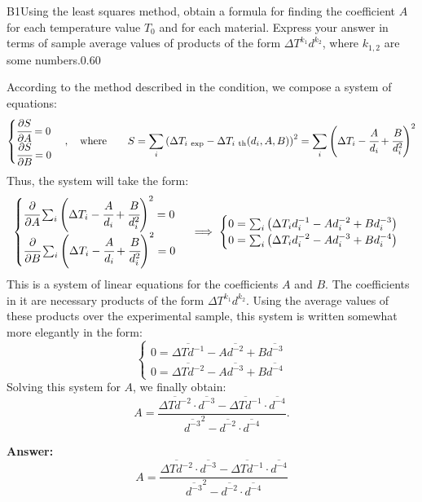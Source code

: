 \documentclass[11pt,a4paper]{article}
\begin{document}
\begin{solcard}{B1}{Using the least squares method, obtain a formula for finding the coefficient $A$ for each temperature value $T_0$ and for each material. Express your answer in terms of sample average values of products of the form $\Delta T^{k_1}d^{k_2}$, where $k_{1,2}$ are some numbers.}{0.60}

According to the method described in the condition, we compose a system of equations:\[\begin{cases} \cfrac{\partial S}{\partial A}=0\\ \cfrac{\partial S}{\partial B}=0\end{cases}, \quad  \text{where} \quad\quad S=\sum_i\left(\Delta T_{i\ \mathrm{exp}}-\Delta T_{i\ \mathrm{th}}(d_i, A, B)\right)^2=\sum_i\left(\Delta T_i-\cfrac A{d_i}+\cfrac B{d_i^2}\right)^2\]Thus, the system will take the form:\[\begin{cases} \cfrac\partial{\partial A}\sum_i\left(\Delta T_i-\cfrac A{d_i}+\cfrac B{d_i^2}\right)^2=0\\\cfrac\partial{\partial B}\sum_i\left(\Delta T_i-\cfrac A{d_i}+\cfrac B{d_i^2}\right)^2=0\end{cases}\implies\begin{cases}0=\sum_i\left(\Delta T_id_i^{-1}-Ad_i^{-2}+Bd_i^{-3}\right)\\0=\sum_i\left(\Delta T_id_i^{-2}-Ad_i^{-3}+Bd_i^{-4}\right)\end{cases}\]This is a system of linear equations for the coefficients $A$ and $B$. The coefficients in it are necessary products of the form $\Delta T^{k_1}d^{k_2}$. Using the average values of these products over the experimental sample, this system is written somewhat more elegantly in the form:\[\begin{cases}0=\overline{\Delta Td^{-1}}-A\overline{d^{-2}}+B\overline{d^{-3}}\\0=\overline{\Delta Td^{-2}}-A\overline{d^{-3}}+B\overline{d^{-4}}\end{cases}\]Solving this system for $A$, we finally obtain:\[A=\frac{\overline{\Delta Td^{-2}}\cdot\overline{d^{-3}}-\overline{\Delta Td^{-1}}\cdot\overline{d^{-4}}}{\overline{d^{-3}}^2-\overline{d^{-2}}\cdot\overline{d^{-4}}}.\]

\par\smallskip\noindent\textbf{Answer:} \[A=\frac{\overline{\Delta Td^{-2}}\cdot\overline{d^{-3}}-\overline{\Delta Td^{-1}}\cdot\overline{d^{-4}}}{\overline{d^{-3}}^2-\overline{d^{-2}}\cdot\overline{d^{-4}}}\]
\end{solcard}
\end{document}
